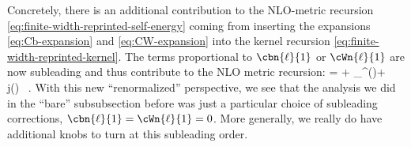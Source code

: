 Concretely, there is an additional contribution to the NLO-metric recursion \eqref{eq:finite-width-reprinted-self-energy} coming from inserting the expansions \eqref{eq:Cb-expansion} and \eqref{eq:CW-expansion} into the kernel recursion \eqref{eq:finite-width-reprinted-kernel}. The terms proportional to $\cbn{\ell}{1}$ or $\cWn{\ell}{1}$ are now subleading and thus contribute to the NLO metric recursion: 
\be\label{eq:nlo-metric-recursion-renormalized}
= + \chi_{\parallel}^{(\ell)}\se{}{\ell}+ \, j\!\le(\Ti{\ker}{}{\ell}\ri)    \, .
\ee 
With this new ``renormalized'' perspective, we see that the analysis we did in the ``bare'' subsubsection before was just a particular choice of subleading corrections, $\cbn{\ell}{1}=\cWn{\ell}{1}=0$. More generally, we really do have additional knobs to turn at this subleading order.

